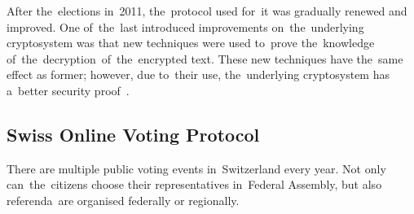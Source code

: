 After the~elections in~2011, the~protocol used for~it was gradually renewed and improved. One of~the~last introduced improvements on~the~underlying cryptosystem was that new techniques were used to~prove the~knowledge of~the~decryption~of~the~encrypted text. These new techniques have the~same effect as former; however, due to~their use, the~underlying cryptosystem has a~better security proof~\cite{Gjosteen2015}.

\subsection{Swiss Online Voting Protocol}
There are multiple public voting events in~Switzerland every year. Not only can~the~citizens choose their representatives in~Federal Assembly, but also referenda~are organised federally or regionally. 

